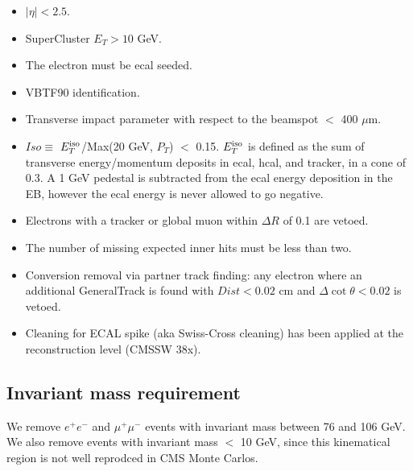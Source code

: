\begin{itemize}


\item $|\eta| < 2.5$.

\item SuperCluster $E_T > 10$ GeV.  

\item The electron must be ecal seeded.

\item VBTF90 identification\cite{ref:vbtf}.

\item Transverse impact parameter with respect to the beamspot $<$ 400 $\mu$m.

\item $Iso \equiv $ $E_T^{\rm iso}$/Max(20 GeV, $P_T$) $<$ 0.15.  
$E_T^{\rm iso}$
is defined as the sum of transverse energy/momentum deposits in ecal,
hcal, and tracker, in a 
cone of 0.3.  A 1 GeV pedestal is subtracted from the ecal energy 
deposition in the EB, however the ecal energy is never allowed to 
go negative.

\item Electrons with a tracker or global muon within $\Delta R$ of 
0.1 are vetoed.

\item The number of missing expected inner hits must be less than 
two\cite{ref:conv}.

\item Conversion removal via partner track finding: any electron
where an additional GeneralTrack is found with $Dist < 0.02$ cm 
and $\Delta \cot \theta < 0.02$ is vetoed\cite{ref:conv}.

\item Cleaning for ECAL spike (aka Swiss-Cross cleaning) has been applied
at the reconstruction level (CMSSW 38x).

\end{itemize}

\subsection{Invariant mass requirement}
\label{sec:zveto}

We remove $e^+e^-$ and $\mu^+ \mu^-$ events with invariant 
mass between 76 and 106 GeV.  We also remove events
with invariant mass $<$ 10 GeV, since this kinematical region is 
not well reprodced in CMS Monte Carlos.

